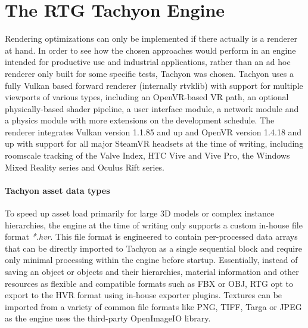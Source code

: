 
\chapter{The \gls{RTG} \gls{Tachyon} Engine} \label{Tachyon}

Rendering optimizations can only be implemented if there actually is a renderer at hand. In order to see how the chosen approaches would perform in an engine intended for productive use and industrial applications, rather than an ad hoc renderer only built for some specific tests, \gls{Tachyon} was chosen. \gls{Tachyon} uses a fully Vulkan based forward renderer (internally \gls{rtvklib}) with support for multiple viewports of various types, including an \gls{OpenVR}-based \gls{VR} path, an optional physically-based shader pipeline, a user interface module, a network module and a physics module with more extensions on the development schedule. The renderer integrates Vulkan version 1.1.85 and up and \gls{OpenVR} version 1.4.18 and up with support for all major SteamVR headsets at the time of writing, including roomscale tracking of the Valve Index, HTC Vive and Vive Pro, the Windows Mixed Reality series and Oculus Rift series. 

\subsubsection{\gls{Tachyon} asset data types}
To speed up asset load primarily for large 3D models or complex instance hierarchies, the engine at the time of writing only supports a custom in-house file format \textit{*.hvr}. This file format is engineered to contain per-processed data arrays that can be directly imported to \gls{Tachyon} as a single sequential block and require only minimal processing within the engine before startup. Essentially, instead of saving an object or objects and their hierarchies, material information and other resources as flexible and compatible formats such as FBX or OBJ, \gls{RTG} opt to export to the HVR format using in-house exporter plugins. Textures can be imported from a variety of common file formats like PNG, TIFF, Targa or JPEG as the engine uses the third-party OpenImageIO \cite{Gritz.2019} library. 

